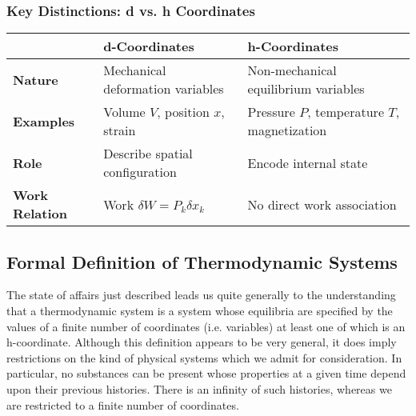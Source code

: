 \documentclass{article}
\theoremstyle{definition}
\begin{document}
\subsubsection{Key Distinctions: d vs. h Coordinates}
\begin{tabular}{|l|l|l|}
\hline
 & \textbf{d-Coordinates} & \textbf{h-Coordinates} \\ 
\hline
\textbf{Nature} & Mechanical deformation variables & Non-mechanical equilibrium variables \\ 
\hline
\textbf{Examples} & Volume \( V \), position \( x \), strain & Pressure \( P \), temperature \( T \), magnetization \\ 
\hline
\textbf{Role} & Describe spatial configuration & Encode internal state \\ 
\hline
\textbf{Work Relation} & Work \( \delta W = P_k \delta x_k \) & No direct work association \\ 
\hline
\end{tabular}
\subsection{Formal Definition of Thermodynamic Systems}
The state of affairs just described leads us quite generally to the understanding that a thermodynamic system is a system whose equilibria are specified by the values of a finite number of coordinates (i.e. variables) at least one of which is an h-coordinate. Although this definition appears to be very general, it does imply restrictions on the kind of physical systems which we admit for consideration. In particular, no substances can be present whose properties at a given time depend upon their previous histories. There is an infinity of such histories, whereas we are restricted to a finite number of coordinates.
\end{document}
